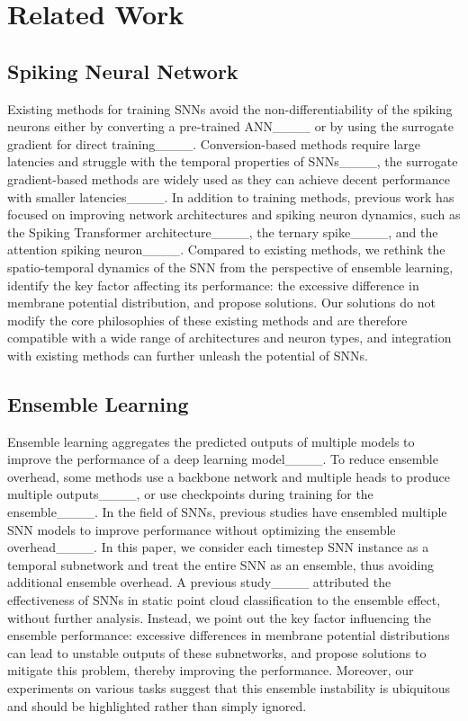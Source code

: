 \section{Related Work}
\vspace{-0.1cm}
\subsection{Spiking Neural Network}
\vspace{-0.1cm}
Existing methods for training SNNs avoid the non-differentiability of the spiking neurons either by converting a pre-trained ANN____ or by using the surrogate gradient for direct training____. Conversion-based methods require large latencies and struggle with the temporal properties of SNNs____, the surrogate gradient-based methods are widely used as they can achieve decent performance with smaller latencies____. In addition to training methods, previous work has focused on improving network architectures and spiking neuron dynamics, such as the Spiking Transformer architecture____, the ternary spike____, and the attention spiking neuron____. Compared to existing methods, we rethink the spatio-temporal dynamics of the SNN from the perspective of ensemble learning, identify the key factor affecting its performance: the excessive difference in membrane potential distribution, and propose solutions. Our solutions do not modify the core philosophies of these existing methods and are therefore compatible with a wide range of architectures and neuron types, and integration with existing methods can further unleash the potential of SNNs.

\vspace{-0.1cm}
\subsection{Ensemble Learning}
\vspace{-0.1cm}

Ensemble learning aggregates the predicted outputs of multiple models to improve the performance of a deep learning model____. To reduce ensemble overhead, some methods use a backbone network and multiple heads to produce multiple outputs____, or use checkpoints during training for the ensemble____. In the field of SNNs, previous studies have ensembled multiple SNN models to improve performance without optimizing the ensemble overhead____. In this paper, we consider each timestep SNN instance as a temporal subnetwork and treat the entire SNN as an ensemble, thus avoiding additional ensemble overhead. A previous study____ attributed the effectiveness of SNNs in static point cloud classification to the ensemble effect, without further analysis. Instead, we point out the key factor influencing the ensemble performance: excessive differences in membrane potential distributions can lead to unstable outputs of these subnetworks, and propose solutions to mitigate this problem, thereby improving the performance. Moreover, our experiments on various tasks suggest that this ensemble instability is ubiquitous and should be highlighted rather than simply ignored.

